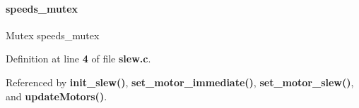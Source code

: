 \paragraph{speeds\+\_\+mutex}
{\footnotesize\ttfamily Mutex speeds\+\_\+mutex\hspace{0.3cm}{\ttfamily [static]}}



Definition at line \textbf{ 4} of file \textbf{ slew.\+c}.



Referenced by \textbf{ init\+\_\+slew()}, \textbf{ set\+\_\+motor\+\_\+immediate()}, \textbf{ set\+\_\+motor\+\_\+slew()}, and \textbf{ update\+Motors()}.


